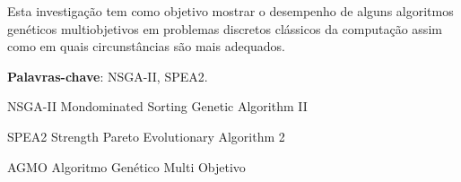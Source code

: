 \documentclass[12pt, %
openright, 
oneside, %
a4paper,    %
brazil]{facom-ufu-abntex2}
\begin{document}
\imprimircapa





\begin{resumo} %
 Esta investigação tem como objetivo mostrar o desempenho de alguns algoritmos genéticos multiobjetivos em problemas discretos clássicos da computação assim como em quais circunstâncias são mais adequados.

 \vspace{\onelineskip}
    
 \noindent
 \textbf{Palavras-chave}: NSGA-II, SPEA2. %
\end{resumo}


\listoftables*
\cleardoublepage



\begin{siglas} %
  \item[NSGA-II] Mondominated Sorting Genetic Algorithm II
  \item[SPEA2] Strength Pareto Evolutionary Algorithm 2 
  \item[AGMO] Algoritmo Genético Multi Objetivo
\end{siglas}


\tableofcontents*
\cleardoublepage
\end{document}
